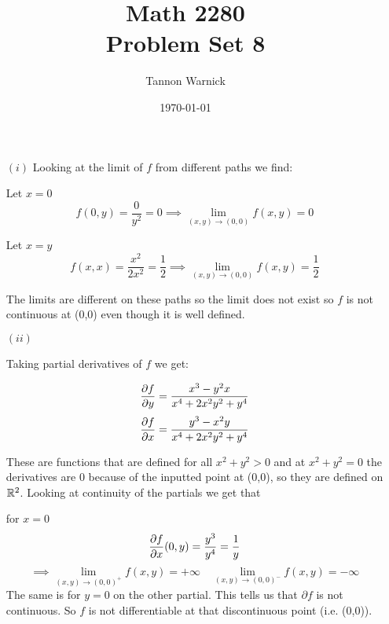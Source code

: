 \documentclass{report}
\title{\Huge{Math 2280}\\Problem Set 8}
\author{\huge{Tannon Warnick}}
\date{\today}
\begin{document}
\maketitle

\begin{itemize}
  \item[\((i)\)]Looking at the limit of \(f\) from different paths we find:

Let \(x=0\)
\[
f(0,y) = \frac{0}{y^2} =0 \implies \lim_{(x,y)\to(0,0)}f(x,y) = 0
\]

Let \(x=y\)
\[
 f(x,x) = \frac{x^2}{2x^2}= \frac{1}{2}\implies \lim_{(x,y)\to(0,0)}f(x,y) = \frac{1}{2}
\]

The limits are different on these paths so the limit does not exist so \(f\) is not continuous at (0,0) even though it is well defined. 

\item[\((ii)\)]

  Taking partial derivatives of \(f\) we get:

  \[
  \frac{\partial f}{\partial y} = \frac{x^3-y^2x}{x^4+2x^2y^2+y^4}
  \]
  \[
  \frac{\partial f}{\partial x} = \frac{y^3-x^2y}{x^4+2x^2y^2+y^4}
  \]

  These are functions that are defined for all \(x^2+y^2>0\) and at \(x^2+y^2 = 0\) the derivatives are 0 because of the inputted point at (0,0), so they are defined on \(\mathbb{R}^2\).
  Looking at continuity of the partials we get that 

  for \(x=0\)
  \[
  \frac{\partial f}{\partial x}(0,y) = \frac{y^3}{y^4} = \frac{1}{y}\]
  \[\implies \lim_{(x,y)\to(0,0)^+}f(x,y) = +\infty\quad\lim_{(x,y)\to(0,0)^-}f(x,y) = -\infty
  \]
  The same is for \(y=0\) on the other partial. This tells us that \(\partial f\) is not continuous. So \(f\) is not differentiable at that discontinuous point (i.e. (0,0)). 
\end{itemize}
\end{document}
